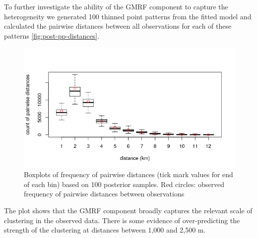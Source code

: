 \documentclass{stylefile16/statsoc}
\begin{document}
To further investigate the ability of the GMRF component to capture the heterogeneity we generated 100 thinned point patterns from the fitted model and calculated the pairwise distances between all observations for each of these patterns \autoref{fig:post-pp-distances}.
\begin{figure}[h]
	\begin{center}
		\includegraphics[scale=0.6]{figures/post_pp_distances.png}
		\caption{Boxplots of frequency of pairwise distances (tick mark values for end of each bin) based on 100 posterior samples.  Red circles: observed frequency of pairwise distances between observations}
		\label{fig:post-pp-distances}
	\end{center}
\end{figure}
The plot shows that the GMRF component broadly captures the relevant scale of clustering in the observed data.  There is some evidence of over-predicting the strength of the clustering at distances between 1,000 and 2,500 m.
\end{document}
